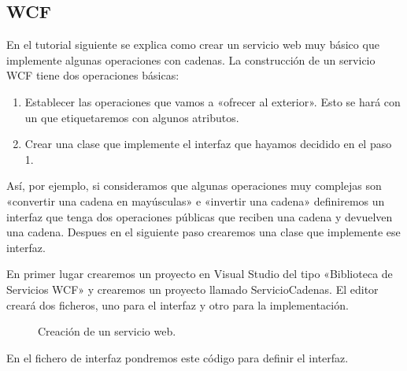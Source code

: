 \documentclass[letterpaper,10pt,spanish]{sphinxmanual}
\begin{document}
\subsection{WCF}
\label{\detokenize{textos/tema4:wcf}}
En el tutorial siguiente se explica como crear un servicio web muy básico que implemente algunas operaciones con cadenas. La construcción de un servicio WCF tiene dos operaciones básicas:
\begin{enumerate}
\def\theenumi{\arabic{enumi}}
\def\labelenumi{\theenumi .}
\makeatletter\def\p@enumii{\p@enumi \theenumi .}\makeatother
\item {} 
Establecer las operaciones que vamos a «ofrecer al exterior». Esto se hará con un  que etiquetaremos con algunos atributos.

\item {} 
Crear una clase que implemente el interfaz que hayamos decidido en el paso 1.

\end{enumerate}

Así, por ejemplo, si consideramos que algunas operaciones muy complejas son «convertir una cadena en mayúsculas» e «invertir una cadena» definiremos un interfaz que tenga dos operaciones públicas que reciben una cadena y devuelven una cadena. Despues en el siguiente paso crearemos una clase que implemente ese interfaz.

En primer lugar crearemos un proyecto en Visual Studio del tipo «Biblioteca de Servicios WCF» y crearemos un proyecto llamado ServicioCadenas. El editor creará dos ficheros, uno para el interfaz y otro para la implementación.

\begin{figure}[htbp]
\centering
\capstart

\noindent{}
\caption{Creación de un servicio web.}\label{\detokenize{textos/tema4:id1}}\end{figure}

En el fichero de interfaz pondremos este código para definir el interfaz.

%
\begin{sphinxVerbatim}[commandchars=\\\{\}]
 
 
 
 
 
 

 
      

          
          
\end{sphinxVerbatim}
\end{document}
